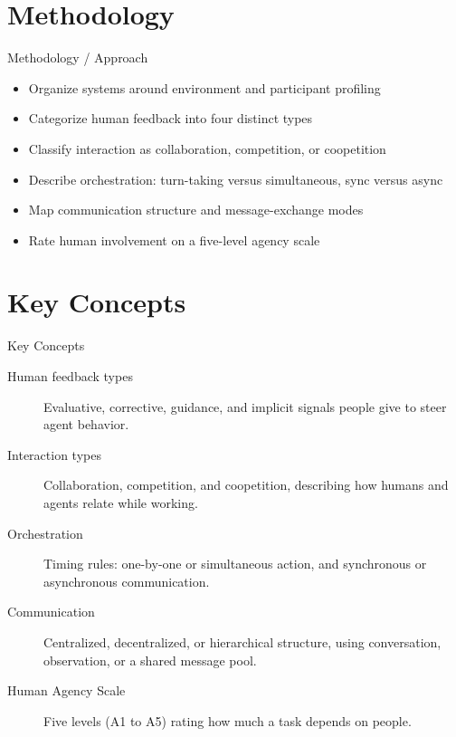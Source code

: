 \documentclass[10pt]{beamer}
\begin{document}
\section{Methodology}
\begin{frame}[allowframebreaks]{Methodology / Approach}
\begin{itemize}
  \item Organize systems around environment and participant profiling
  \item Categorize human feedback into four distinct types
  \item Classify interaction as collaboration, competition, or coopetition
  \item Describe orchestration: turn-taking versus simultaneous, sync versus async
  \item Map communication structure and message-exchange modes
  \item Rate human involvement on a five-level agency scale
\end{itemize}
\end{frame}

\section{Key Concepts}
\begin{frame}[allowframebreaks]{Key Concepts}
  \begin{description}
    \item[Human feedback types] Evaluative, corrective, guidance, and implicit signals people give to steer agent behavior.
    \item[Interaction types] Collaboration, competition, and coopetition, describing how humans and agents relate while working.
    \item[Orchestration] Timing rules: one-by-one or simultaneous action, and synchronous or asynchronous communication.
    \item[Communication] Centralized, decentralized, or hierarchical structure, using conversation, observation, or a shared message pool.
    \item[Human Agency Scale] Five levels (A1 to A5) rating how much a task depends on people.
  \end{description}
\end{frame}
\end{document}
